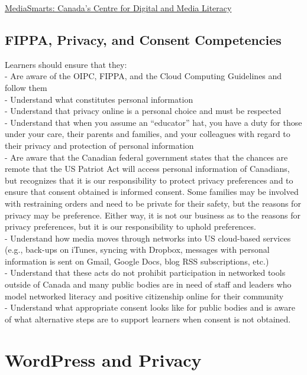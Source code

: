 \documentclass[
]{book}
\begin{document}
\href{http://mediasmarts.ca/}{MediaSmarts: Canada's Centre for Digital and Media Literacy}

\hypertarget{fippa-privacy-and-consent-competencies}{%
\subsection*{FIPPA, Privacy, and Consent Competencies}\label{fippa-privacy-and-consent-competencies}}

Learners should ensure that they:\\
- Are aware of the OIPC, FIPPA, and the Cloud Computing Guidelines and follow them\\
- Understand what constitutes personal information\\
- Understand that privacy online is a personal choice and must be respected\\
- Understand that when you assume an ``educator'' hat, you have a duty for those under your care, their parents and families, and your colleagues with regard to their privacy and protection of personal information\\
- Are aware that the Canadian federal government states that the chances are remote that the US Patriot Act will access personal information of Canadians, but recognizes that it is our responsibility to protect privacy preferences and to ensure that consent obtained is informed consent. Some families may be involved with restraining orders and need to be private for their safety, but the reasons for privacy may be preference. Either way, it is not our business as to the reasons for privacy preferences, but it is our responsibility to uphold preferences.\\
- Understand how media moves through networks into US cloud-based services (e.g., back-ups on iTunes, syncing with Dropbox, messages with personal information is sent on Gmail, Google Docs, blog RSS subscriptions, etc.)\\
- Understand that these acts do not prohibit participation in networked tools outside of Canada and many public bodies are in need of staff and leaders who model networked literacy and positive citizenship online for their community\\
- Understand what appropriate consent looks like for public bodies and is aware of what alternative steps are to support learners when consent is not obtained.

\hypertarget{wordpress-and-privacy}{%
\section{WordPress and Privacy}\label{wordpress-and-privacy}}
\end{document}
